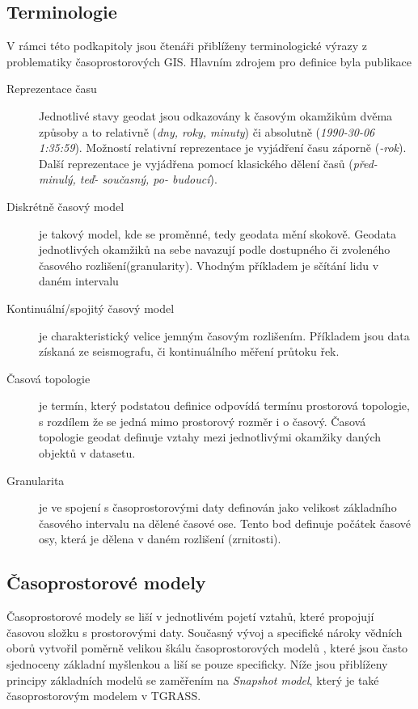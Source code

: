 \documentclass[a4paper,12pt,oneside]{report}
\begin{document}
\subsection{Terminologie}
\label{subsec:terminologie}
V rámci této podkapitoly jsou čtenáři přiblíženy terminologické výrazy z problematiky časoprostorových GIS. Hlavním zdrojem pro definice byla publikace \cite{pelekis}
\begin{description}
\item[Reprezentace času] Jednotlivé stavy geodat jsou odkazovány k  časovým okamžikům dvěma způsoby a to relativně  (\textit{dny, roky, minuty})  či absolutně (\textit{1990-30-06 1:35:59}). Možností relativní reprezentace je vyjádření času záporně (\textit{-rok}). Další reprezentace je vyjádřena pomocí klasického dělení časů (\textit {před- minulý, teď- současný, po- budoucí}).

\item[Diskrétně časový model] je takový model, kde se proměnné, tedy geodata  mění skokově. Geodata jednotlivých okamžiků na sebe navazují podle dostupného či zvoleného časového rozlišení(granularity). Vhodným příkladem je sčítání lidu v daném intervalu

\item[Kontinuální/spojitý časový model] je charakteristický velice jemným časovým rozlišením. Příkladem jsou data získaná ze seismografu, či kontinuálního měření průtoku řek.

\item[Časová topologie] je termín, který podstatou definice odpovídá  termínu prostorová topologie, s rozdílem že se jedná mimo prostorový rozměr i o časový. Časová topologie geodat definuje vztahy mezi jednotlivými okamžiky daných objektů v datasetu.

\item[Granularita] je ve spojení s časoprostorovými daty definován jako velikost základního časového intervalu na dělené časové ose. Tento bod definuje počátek časové osy, která je dělena v daném rozlišení (zrnitosti). 
\end{description}

\subsection{Časoprostorové modely}

Časoprostorové modely se liší v jednotlivém pojetí vztahů, které propojují časovou složku s prostorovými daty. Současný vývoj a specifické nároky vědních oborů vytvořil poměrně velikou škálu časoprostorových modelů \cite{pelekis}, které jsou často sjednoceny  základní myšlenkou a liší se pouze specificky. Níže jsou přiblíženy principy základních modelů se zaměřením na \textit{Snapshot model}, který je také časoprostorovým modelem v TGRASS.
\end{document}
